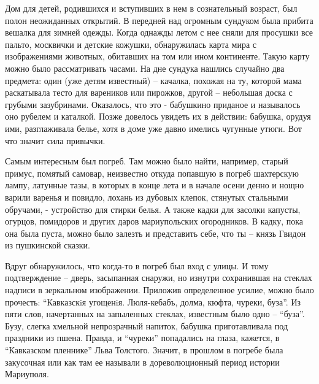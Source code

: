 Дом для детей, родившихся и вступивших в нем в сознательный возраст, был полон
неожиданных открытий. В передней над огромным сундуком была прибита вешалка для
зимней одежды. Когда однажды летом с нее сняли для просушки все пальто,
москвички и детские кожушки, обнаружилась карта мира с изображениями животных,
обитавших на том или ином континенте. Такую карту можно было рассматривать
часами. На дне сундука нашлись случайно два предмета: один (уже детям
известный) – качалка, похожая на ту, которой мама раскатывала тесто для
вареников или пирожков, другой – небольшая доска с грубыми зазубринами.
Оказалось, что это -  бабушкино приданое и называлось оно рубелем и каталкой.
Позже довелось увидеть их в действии: бабушка, орудуя ими, разглаживала белье,
хотя в доме уже давно имелись чугунные утюги. Вот что значит сила привычки.

Самым интересным был погреб. Там можно было найти, например, старый примус,
помятый самовар, неизвестно откуда попавшую в погреб шахтерскую лампу, латунные
тазы, в которых в конце лета и в начале осени денно и нощно варили варенья и
повидло, лохань из дубовых клепок, стянутых стальными обручами, - устройство
для стирки белья. А также кадки для засолки капусты, огурцов, помидоров и
других даров мариупольских огородников. В кадку, пока она была пуста, можно
было залезть и представить себе, что ты – князь Гвидон из пушкинской сказки. 

Вдруг обнаружилось, что когда-то в погреб был вход с улицы. И тому
подтверждение – дверь, засыпанная снаружи, но изнутри сохранившая на стеклах
надписи в зеркальном изображении. Приложив определенное усилие, можно было
прочесть: \enquote{Кавказскiя угощенiя. Люля-кебабъ, долма, кюфта, чуреки, буза}. Из
пяти слов, начертанных на запыленных стеклах, известным было одно – \enquote{буза}.
Бузу, слегка хмельной непрозрачный напиток, бабушка приготавливала под
праздники из пшена. Правда, и \enquote{чуреки} попадались на глаза, кажется, в
\enquote{Кавказском пленнике} Льва Толстого. Значит, в прошлом в погребе была
закусочная или как там ее называли в дореволюционный период истории Мариуполя.

